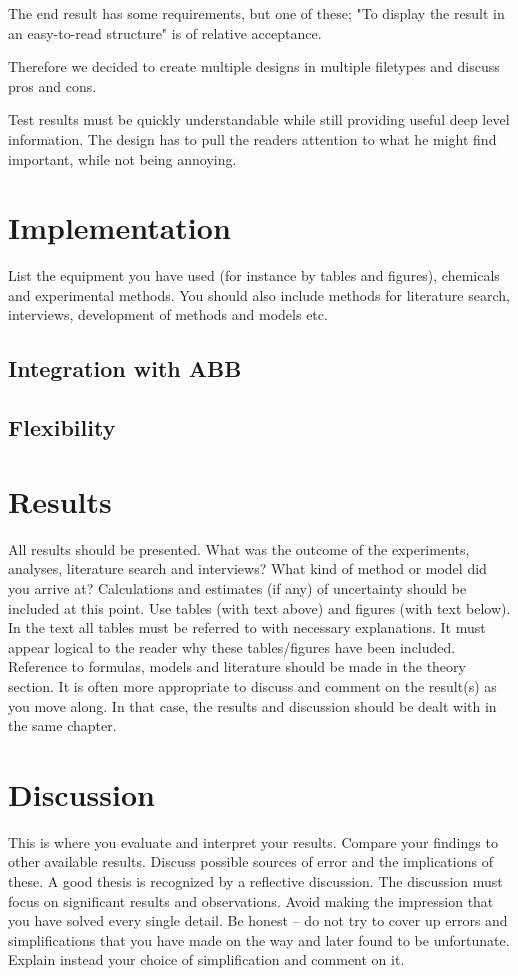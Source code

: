 \documentclass{article}
\begin{document}
	The end result has some requirements, but one of these; "To display the result in an easy-to-read
	structure" is of relative acceptance.
	
	Therefore we decided to create multiple designs in multiple filetypes and discuss pros and cons.
	
	
	Test results must be quickly understandable while still providing useful deep level information.
	The design has to pull the readers attention to what he might find important, while not being annoying. 
	\pagebreak
	
	
	
	\section{Implementation} \label{implementation}
	List the equipment you have used (for instance by tables and figures),
	chemicals and experimental methods. You should also include methods for literature search,
	interviews, development of methods and models etc. 
	
	\subsection{Integration with ABB}
	\subsection{Flexibility}
	
	\pagebreak
	
	\section{Results} \label{results}
	All results should be presented. What was the outcome of the experiments, analyses,
	literature search and interviews? What kind of method or model did you arrive at?
	Calculations and estimates (if any) of uncertainty should be included at this point. Use tables
	(with text above) and figures (with text below). In the text all tables must be referred to with
	necessary explanations. It must appear logical to the reader why these tables/figures have
	been included. Reference to formulas, models and literature should be made in the theory
	section. It is often more appropriate to discuss and comment on the result(s) as you move
	along. In that case, the results and discussion should be dealt with in the same chapter. 
	\pagebreak
	
	\section{Discussion} \label{discussion}
	This is where you evaluate and interpret your results. Compare your findings to
	other available results. Discuss possible sources of error and the implications of these. A good
	thesis is recognized by a reflective discussion. The discussion must focus on significant
	results and observations. Avoid making the impression that you have solved every single
	detail. Be honest – do not try to cover up errors and simplifications that you have made on the
	way and later found to be unfortunate. Explain instead your choice of simplification and
	comment on it. 
	\pagebreak
	
\end{document}

